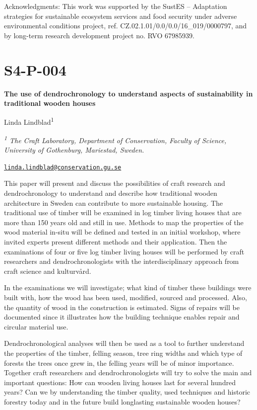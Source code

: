\documentclass[
]{book}
\begin{document}
Acknowledgments: This work was supported by the SustES -- Adaptation strategies for sustainable ecosystem services and food security under adverse environmental conditions project, ref. CZ.02.1.01/0.0/0.0/16\_019/0000797, and by long-term research development project no. RVO 67985939.

\hypertarget{s4-p-004}{%
\section*{S4-P-004}\label{s4-p-004}}

\textbf{The use of dendrochronology to understand aspects of sustainability in traditional wooden houses}

Linda Lindblad\textsuperscript{1}

\emph{\textsuperscript{1} The Craft Laboratory, Department of Conservation, Faculty of Science, University of Gothenburg, Mariestad, Sweden.}

\href{mailto:linda.lindblad@conservation.gu.se}{\nolinkurl{linda.lindblad@conservation.gu.se}}

This paper will present and discuss the possibilities of craft research and dendrochronology to understand and describe how traditional wooden architecture in Sweden can contribute to more sustainable housing. The traditional use of timber will be examined in log timber living houses that are more than 150 years old and still in use. Methods to map the properties of the wood material in-situ will be defined and tested in an initial workshop, where invited experts present different methods and their application. Then the examinations of four or five log timber living houses will be performed by craft researchers and dendrochronologists with the interdisciplinary approach from craft science and kulturvård.

In the examinations we will investigate; what kind of timber these buildings were built with, how the wood has been used, modified, sourced and processed. Also, the quantity of wood in the construction is estimated. Signs of repairs will be documented since it illustrates how the building technique enables repair and circular material use.

Dendrochronological analyses will then be used as a tool to further understand the properties of the timber, felling season, tree ring widths and which type of forests the trees once grew in, the felling years will be of minor importance. Together craft researchers and dendrochronologists will try to solve the main and important questions: How can wooden living houses last for several hundred years? Can we by understanding the timber quality, used techniques and historic forestry today and in the future build longlasting sustainable wooden houses?
\end{document}
